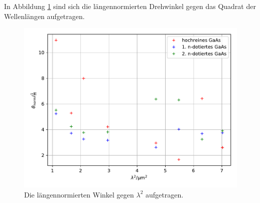 \clearpage
In Abbildung \ref{fig:3} sind sich die längennormierten Drehwinkel gegen das
Quadrat der Wellenlängen aufgetragen.
\begin{figure}
  \centering
  \includegraphics[scale=0.5]{b.pdf}
  \caption{Die längennormierten Winkel gegen $\lambda ^2$ aufgetragen.}
  \label{fig:3}
\end{figure}
